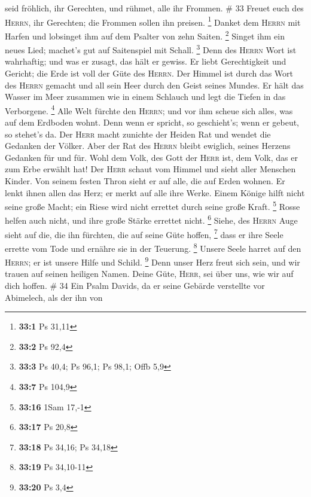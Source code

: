 seid fröhlich, ihr Gerechten, und rühmet, alle ihr Frommen. \# 33
 Freuet euch des \textsc{Herrn}, ihr Gerechten; die
Frommen sollen ihn preisen. \footnote{\textbf{33:1} Ps 31,11}
 Danket dem \textsc{Herrn} mit Harfen und lobsinget ihm
auf dem Psalter von zehn Saiten. \footnote{\textbf{33:2} Ps 92,4}
 Singet ihm ein neues Lied; machet's gut auf Saitenspiel
mit Schall. \footnote{\textbf{33:3} Ps 40,4; Ps 96,1; Ps 98,1; Offb 5,9}
 Denn des \textsc{Herrn} Wort ist wahrhaftig; und was er
zusagt, das hält er gewiss.  Er liebt Gerechtigkeit und
Gericht; die Erde ist voll der Güte des \textsc{Herrn}. 
Der Himmel ist durch das Wort des \textsc{Herrn} gemacht und all sein
Heer durch den Geist seines Mundes.  Er hält das Wasser im
Meer zusammen wie in einem Schlauch und legt die Tiefen in das
Verborgene. \footnote{\textbf{33:7} Ps 104,9}  Alle Welt
fürchte den \textsc{Herrn}; und vor ihm scheue sich alles, was auf dem
Erdboden wohnt.  Denn wenn er spricht, so geschieht's;
wenn er gebeut, so stehet's da.  Der \textsc{Herr} macht
zunichte der Heiden Rat und wendet die Gedanken der Völker.
 Aber der Rat des \textsc{Herrn} bleibt ewiglich, seines
Herzens Gedanken für und für.  Wohl dem Volk, des Gott
der \textsc{Herr} ist, dem Volk, das er zum Erbe erwählt hat!
 Der \textsc{Herr} schaut vom Himmel und sieht aller
Menschen Kinder.  Von seinem festen Thron sieht er auf
alle, die auf Erden wohnen.  Er lenkt ihnen allen das
Herz; er merkt auf alle ihre Werke.  Einem Könige hilft
nicht seine große Macht; ein Riese wird nicht errettet durch seine große
Kraft. \footnote{\textbf{33:16} 1Sam 17,-1}  Rosse helfen
auch nicht, und ihre große Stärke errettet nicht. \footnote{\textbf{33:17}
  Ps 20,8}  Siehe, des \textsc{Herrn} Auge sieht auf die,
die ihn fürchten, die auf seine Güte hoffen, \footnote{\textbf{33:18} Ps
  34,16; Ps 34,18}  dass er ihre Seele errette vom Tode
und ernähre sie in der Teuerung. \footnote{\textbf{33:19} Ps 34,10-11}
 Unsere Seele harret auf den \textsc{Herrn}; er ist
unsere Hilfe und Schild. \footnote{\textbf{33:20} Ps 3,4}
 Denn unser Herz freut sich sein, und wir trauen auf
seinen heiligen Namen.  Deine Güte, \textsc{Herr}, sei
über uns, wie wir auf dich hoffen. \# 34  Ein Psalm
Davids, da er seine Gebärde verstellte vor Abimelech, als der ihn von
